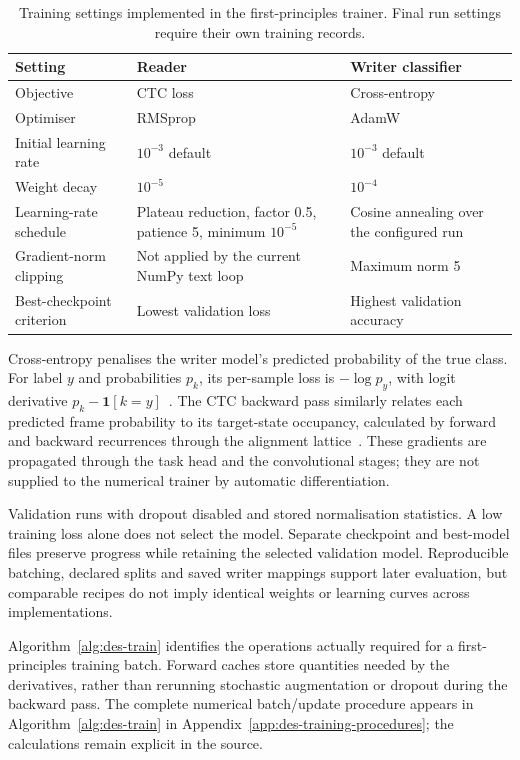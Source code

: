 \begin{table}[!htbp]\centering\small
\begin{tabularx}{\linewidth}{|l|X|X|}
\hline\textbf{Setting}&\textbf{Reader}&\textbf{Writer classifier}\\\hline
Objective&CTC loss&Cross-entropy\\\hline
Optimiser&RMSprop&AdamW\\\hline
Initial learning rate&$10^{-3}$ default&$10^{-3}$ default\\\hline
Weight decay&$10^{-5}$&$10^{-4}$\\\hline
Learning-rate schedule&Plateau reduction, factor 0.5, patience 5, minimum $10^{-5}$&Cosine annealing over the configured run\\\hline
Gradient-norm clipping&Not applied by the current NumPy text loop&Maximum norm 5\\\hline
Best-checkpoint criterion&Lowest validation loss&Highest validation accuracy\\\hline
\end{tabularx}
\caption{Training settings implemented in the first-principles trainer. Final run settings require their own training records.}
\label{tab:des-training}
\end{table}

Cross-entropy penalises the writer model's predicted probability of the true class. For label $y$ and probabilities $p_k$, its per-sample loss is $-\log p_y$, with logit derivative $p_k-\mathbf{1}[k=y]$~\cite[p.~6, Eqs.~(13)--(14)]{graves2013}. The CTC backward pass similarly relates each predicted frame probability to its target-state occupancy, calculated by forward and backward recurrences through the alignment lattice~\cite[PDF pp.~4--6]{graves2006}. These gradients are propagated through the task head and the convolutional stages; they are not supplied to the numerical trainer by automatic differentiation.

Validation runs with dropout disabled and stored normalisation statistics. A low training loss alone does not select the model. Separate checkpoint and best-model files preserve progress while retaining the selected validation model. Reproducible batching, declared splits and saved writer mappings support later evaluation, but comparable recipes do not imply identical weights or learning curves across implementations.

Algorithm~\ref{alg:des-train} identifies the operations actually required for a first-principles training batch. Forward caches store quantities needed by the derivatives, rather than rerunning stochastic augmentation or dropout during the backward pass.
The complete numerical batch/update procedure appears in Algorithm~\ref{alg:des-train} in Appendix~\ref{app:des-training-procedures}; the calculations remain explicit in the source.

